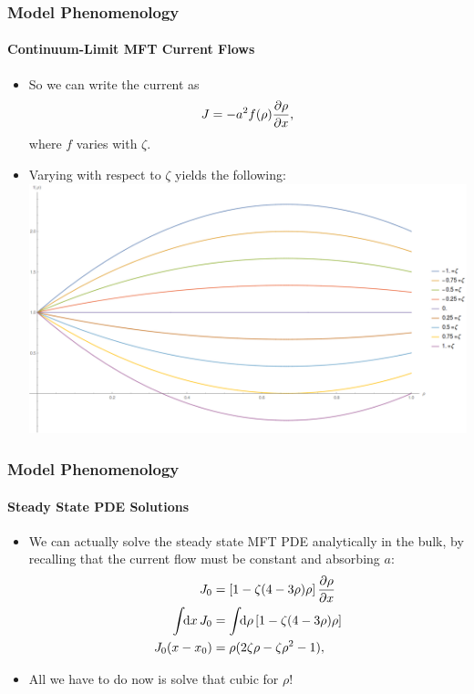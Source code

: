 \documentclass{beamer}
\begin{document}
\begin{frame}
\frametitle{Model Phenomenology}
\framesubtitle{Continuum-Limit MFT Current Flows}
\begin{itemize}
 \item So we can write the current as
 \begin{equation*}
  J = -a^2 f(\rho) \frac{\partial \rho}{\partial x},
 \end{equation*}
where $f$ varies with $\zeta$.
\item Varying with respect to $\zeta$ yields the following:
\includegraphics[width=0.75\linewidth]{images/currentFlows}
\end{itemize}
\end{frame}

\begin{frame}
 \frametitle{Model Phenomenology}
 \framesubtitle{Steady State PDE Solutions}
 \begin{itemize}
  \item We can actually solve the steady state MFT PDE analytically in the bulk, by recalling that the current flow must be constant and absorbing $a$:
  \begin{align*}
   J_0 &= \left[ 1 - \zeta (4-3\rho)\rho \right] \frac{\partial \rho}{\partial x} \\
   \int \! \! \mathrm{d}x \, J_0 &=  \int \! \! \mathrm{d}\rho \left[ 1 - \zeta (4-3\rho)\rho \right] \\
   J_0 (x-x_0) &= \rho (2\zeta \rho - \zeta \rho^2 -1  ),
  \end{align*}
\item All we have to do now is solve that cubic for $\rho$!
 \end{itemize}

\end{frame}
\end{document}
